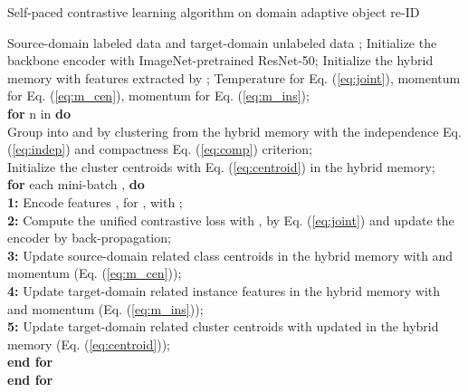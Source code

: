 \documentclass{article}
\begin{document}
\begin{algorithm}[H]
\scriptsize
\caption{\small Self-paced contrastive learning algorithm on domain adaptive object re-ID} 
\label{alg}
\begin{algorithmic}
\REQUIRE Source-domain labeled data  and target-domain unlabeled data ;
\REQUIRE Initialize the backbone encoder  with ImageNet-pretrained ResNet-50;
\REQUIRE Initialize the hybrid memory with features extracted by ;
\REQUIRE  Temperature  for Eq. (\ref{eq:joint}), momentum  for Eq. (\ref{eq:m_cen}), momentum  for Eq. (\ref{eq:m_ins}); \\
\textbf{for} n in  \textbf{do}\\
\quad Group  into  and  by clustering  from the hybrid memory with the independence Eq. (\ref{eq:indep}) and compactness Eq. (\ref{eq:comp}) criterion; \\
\quad Initialize the cluster centroids  with Eq. (\ref{eq:centroid}) in the hybrid memory; \\
\quad \textbf{for} each mini-batch ,  \textbf{do}\\
\quad \quad \textbf{1:} Encode features ,  for ,  with ; \\
\quad \quad \textbf{2:} Compute the unified contrastive loss with ,  by Eq. (\ref{eq:joint}) and update the encoder  by back-propagation; \\
\quad \quad \textbf{3:} Update source-domain related class centroids  in the hybrid memory with  and momentum  (Eq. (\ref{eq:m_cen}));\\
\quad \quad \textbf{4:} Update target-domain related instance features  in the hybrid memory with  and momentum  (Eq. (\ref{eq:m_ins})); \\
\quad \quad \textbf{5:} Update target-domain related cluster centroids  with updated  in the hybrid memory (Eq. (\ref{eq:centroid})); \\
\quad \textbf{end for}\\
\textbf{end for}
\end{algorithmic}
\end{algorithm}
\end{document}
